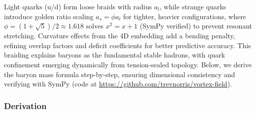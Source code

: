 Light quarks (u/d) form loose braids with radius $a_l$, while strange quarks introduce golden ratio scaling $a_s = \phi a_l$ for tighter, heavier configurations, where $\phi = (1 + \sqrt{5})/2 \approx 1.618$ solves $x^2 = x + 1$ (SymPy verified) to prevent resonant stretching. Curvature effects from the 4D embedding add a bending penalty, refining overlap factors and deficit coefficients for better predictive accuracy. This braiding explains baryons as the fundamental stable hadrons, with quark confinement emerging dynamically from tension-sealed topology. Below, we derive the baryon mass formula step-by-step, ensuring dimensional consistency and verifying with SymPy (code at \url{https://github.com/trevnorris/vortex-field}).

\subsubsection{Derivation}

